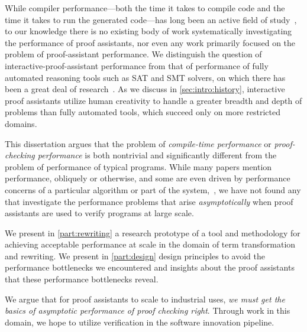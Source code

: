 While compiler performance---both the time it takes to compile code and the time it takes to run the generated code---has long been an active field of study~\cite{CC++Performance2017,georges2007statistically,mytkowicz-wrong-data}, to our knowledge there is no existing body of work systematically investigating the performance of proof assistants, nor even any work primarily focused on the problem of proof-assistant performance.
We distinguish the question of interactive-proof-assistant performance from that of performance of fully automated reasoning tools such as SAT and SMT solvers, on which there has been a great deal of research~\cite{Efficiency1994Boulton}.
As we discuss in \autoref{sec:intro:history}, interactive proof assistants utilize human creativity to handle a greater breadth and depth of problems than fully automated tools, which succeed only on more restricted domains.

This dissertation argues that the problem of \emph{compile-time performance} or \emph{proof-checking performance} is both nontrivial and significantly different from the problem of performance of typical programs.
While many papers mention performance, obliquely or otherwise, and some are even driven by performance concerns of a particular algorithm or part of the system,~\cites[p.~1382]{gonthier2008formal}{Efficiency1994Boulton}{Proving2005Benjamin}{Idris2Faster2020Brady}{Recognizing1989Benanav}{mechanical1990Pierce}{CelikETAL17iCoq}{PalmskogETAL18piCoq}{vmcompute}{thesis-nogin}{Idris2Faster2020Brady}, we have not found any that investigate the performance problems that arise \emph{asymptotically} when proof assistants are used to verify programs at large scale.

We present in \autoref{part:rewriting} a research prototype of a tool and methodology for achieving acceptable performance at scale in the domain of term transformation and rewriting.
We present in \autoref{part:design} design principles to avoid the performance bottlenecks we encountered and insights about the proof assistants that these performance bottlenecks reveal.

We argue that for proof assistants to scale to industrial uses, \emph{we must get the basics of asymptotic performance of proof checking right}.
Through work in this domain, we hope to utilize verification in the software innovation pipeline.


